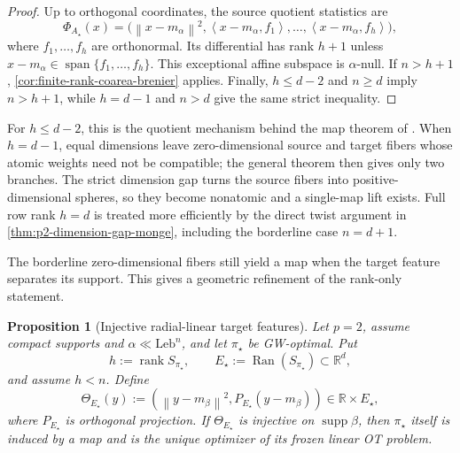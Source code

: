 \documentclass[11pt,a4paper]{article}
\newtheorem{proposition}[theorem]{Proposition}
\theoremstyle{definition}
\theoremstyle{remark}
\newcommand{\R}{\mathbb R}
\newcommand{\supp}{\operatorname{supp}}
\newcommand{\rank}{\operatorname{rank}}
\newcommand{\Ran}{\operatorname{Ran}}
\newcommand{\norm}[1]{\left\lVert #1\right\rVert}
\newcommand{\ip}[2]{\left\langle #1,#2\right\rangle}
\begin{document}
\begin{proof}
Up to orthogonal coordinates, the source quotient statistics are
\begin{equation}
  \Phi_{A_\star}(x)
  =\bigl(\norm{x-m_\alpha}^2,
          \ip{x-m_\alpha}{f_1},\ldots,
          \ip{x-m_\alpha}{f_h}\bigr),
  \label{eq:p2-source-quotient-map}
\end{equation}
where \(f_1,\ldots,f_h\) are orthonormal.  Its differential has rank
\(h+1\) unless
\(
  x-m_\alpha\in\operatorname{span}\{f_1,\ldots,f_h\}.
\)
This exceptional affine subspace is \(\alpha\)-null.  If \(n>h+1\),
\cref{cor:finite-rank-coarea-brenier} applies.  Finally,
\(h\leq d-2\) and \(n\geq d\) imply \(n>h+1\), while
\(h=d-1\) and \(n>d\) give the same strict inequality.
\end{proof}

For \(h\leq d-2\), this is the quotient mechanism behind the map theorem of
\citet{DumontLacombeVialard2025}.  When \(h=d-1\), equal dimensions leave
zero-dimensional source and target fibers whose atomic weights need not be
compatible; the general theorem then gives only two branches.  The strict
dimension gap turns the source fibers into positive-dimensional spheres, so
they become nonatomic and a single-map lift exists.  Full row rank
\(h=d\) is treated more efficiently by the direct twist argument in
\cref{thm:p2-dimension-gap-monge}, including the borderline case \(n=d+1\).

The borderline zero-dimensional fibers still yield a map when the target
feature separates its support.  This gives a geometric refinement of the
rank-only statement.

\begin{proposition}[Injective radial-linear target features]
\label{prop:p2-injective-target-feature}
Let \(p=2\), assume compact supports and
\(\alpha\ll\mathrm{Leb}^n\), and let \(\pi_\star\) be GW-optimal.  Put
\begin{equation*}
  h:=\rank S_{\pi_\star},
  \qquad
  E_\star:=\Ran(S_{\pi_\star})\subset\R^d,
\end{equation*}
and assume \(h<n\).  Define
\begin{equation}
  \Theta_{E_\star}(y)
  :=\left(\norm{y-m_\beta}^2,
           P_{E_\star}(y-m_\beta)\right)
  \in\R\times E_\star,
  \label{eq:p2-target-radial-linear-feature}
\end{equation}
where \(P_{E_\star}\) is orthogonal projection.  If
\(\Theta_{E_\star}\) is injective on \(\supp\beta\), then
\(\pi_\star\) itself is induced by a map and is the unique optimizer of its
frozen linear OT problem.
\end{proposition}
\end{document}
